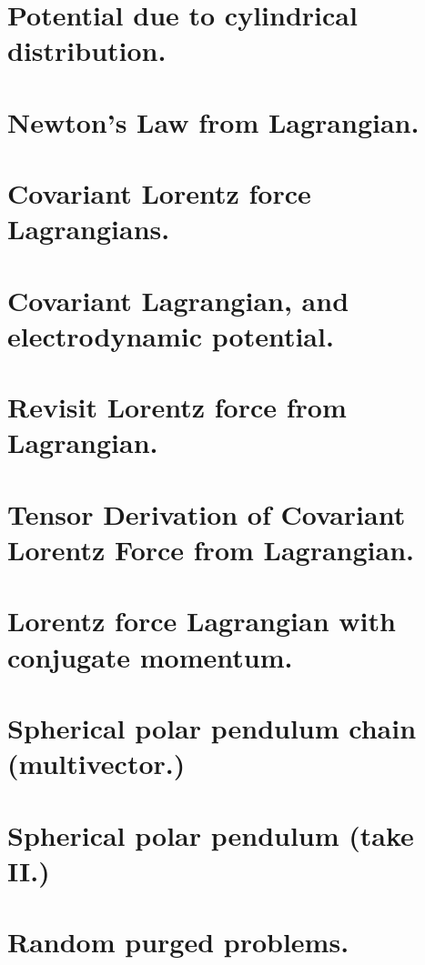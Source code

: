 \chapter{Potential due to cylindrical distribution.}
   
\chapter{Newton's Law from Lagrangian.}
\chapter{Covariant Lorentz force Lagrangians.}
   
\chapter{Covariant Lagrangian, and electrodynamic potential.}
\chapter{Revisit Lorentz force from Lagrangian.}
\chapter{Tensor Derivation of Covariant Lorentz Force from Lagrangian.}
\chapter{Lorentz force Lagrangian with conjugate momentum.}
\chapter{Spherical polar pendulum chain (multivector.)}
   
\chapter{Spherical polar pendulum (take II.)}
   
\chapter{Random purged problems.}
   
